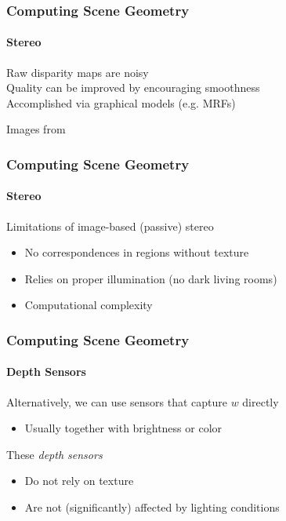 \documentclass[xetex,professionalfont]{beamer}
\newcommand{\eg}{\mbox{e.g.}\xspace} %
\begin{document}

\begin{frame}
\frametitle{Computing Scene Geometry}
\framesubtitle{Stereo}

Raw disparity maps are noisy\\\medskip
Quality can be improved by encouraging smoothness\\\medskip
Accomplished via graphical models (\eg MRFs)

\bigskip
\begin{center}
    {\centering Images from \cite{prince12}}
\end{center}

\end{frame}


\begin{frame}
\frametitle{Computing Scene Geometry}
\framesubtitle{Stereo}

Limitations of image-based (passive) stereo
\begin{itemize}
    \item No correspondences in regions without texture %
    \item Relies on proper illumination (no dark living rooms) %
    \item Computational complexity %
\end{itemize}

\end{frame}


\begin{frame}
\frametitle{Computing Scene Geometry}
\framesubtitle{Depth Sensors}

Alternatively, we can use sensors that capture $w$ directly
\begin{itemize}
    \item Usually together with brightness or color
\end{itemize}

\bigskip
These \emph{depth sensors}
\begin{itemize}
    \item Do not rely on texture
    \item Are not (significantly) affected by lighting conditions
\end{itemize}

\end{frame}
\end{document}
